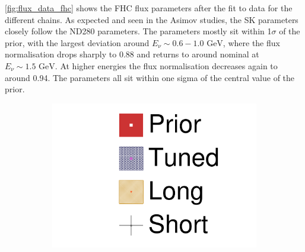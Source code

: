 \autoref{fig:flux_data_fhc} shows the FHC flux parameters after the fit to data for the different chains. As expected and seen in the Asimov studies, the SK parameters closely follow the ND280 parameters. The parameters mostly sit within 1$\sigma$ of the prior, with the largest deviation around $E_\nu \sim 0.6-1.0\text{ GeV}$, where the flux normalisation drops sharply to 0.88 and returns to around nominal at $E_\nu\sim1.5\text{ GeV}$. At higher energies the flux normalisation decreases again to around 0.94. The parameters all sit within one sigma of the central value of the prior.
\begin{figure}[h]
	\begin{subfigure}[t]{0.10\textwidth}
		\includegraphics[width=\textwidth, trim={0mm 0mm 0mm 0mm}, clip,page=1]{figures/mach3/data/2017b_NewData_NewDet_UpdXsecStep_2Xsec_4Det_5Flux_0_2017b_June_NewDet_merge_2017b_NewDet_June_Long_0}
	\end{subfigure}
	

\end{figure}
